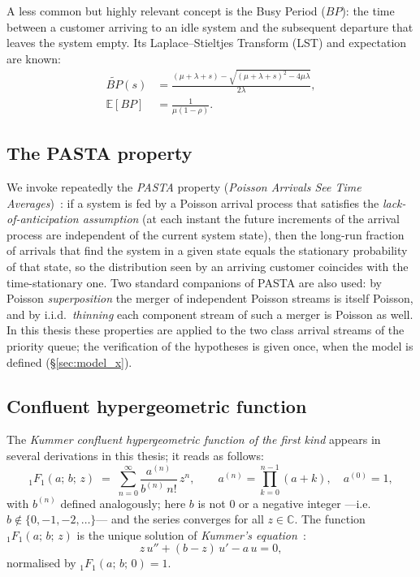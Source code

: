 A less common but highly relevant concept is the Busy Period ($BP$): the time between a customer arriving to an idle system and the subsequent departure that leaves the system empty. Its Laplace--Stieltjes Transform (LST) and expectation are known:
\begin{align}
    \widetilde{BP}(s) &= \frac{(\mu+\lambda+s) - \sqrt{(\mu+\lambda+s)^2 - 4\mu\lambda}}{2\lambda},\label{eq:mm1:bp_lst} \\
    \mathbb{E}[BP]    &= \frac{1}{\mu(1-\rho)}. \label{eq:mm1:bp_mean}
\end{align}

\subsection{The PASTA property}\label{ssec:priority}

We invoke repeatedly the \emph{PASTA} property (\emph{Poisson Arrivals See Time
Averages})~\cite{adan2002queueing}: if a system is fed by a Poisson arrival process that
satisfies the \emph{lack-of-anticipation assumption} (at each instant the future increments
of the arrival process are independent of the current system state), then the long-run
fraction of arrivals that find the system in a given state equals the stationary probability
of that state, so the distribution seen by an arriving customer coincides with the
time-stationary one. Two standard companions of PASTA are also used: by Poisson
\emph{superposition} the merger of independent Poisson streams is itself Poisson, and by
i.i.d.\ \emph{thinning} each component stream of such a merger is Poisson as well. In this
thesis these properties are applied to the two class arrival streams of the priority queue;
the verification of the hypotheses is given once, when the model is defined
(\S\ref{sec:model_x}).

\subsection{Confluent hypergeometric function}\label{ssec:kummer}

The \emph{Kummer confluent hypergeometric function of the first kind} appears in several derivations in this thesis; it reads as follows:
\begin{equation}
    {}_1F_1(a;\,b;\,z) \;=\;
        \sum_{n=0}^{\infty} \frac{a^{(n)}}{b^{(n)}\,n!}\,z^n,
    \qquad a^{(n)} = \prod_{k=0}^{n-1}(a+k),\quad a^{(0)}=1,
    \label{eq:kummer:series}
\end{equation}
with $b^{(n)}$ defined analogously; here $b$ is not $0$ or a negative integer ---i.e.\ $b \notin \{0,-1,-2,\dots\}$--- and the series converges for all
$z\in\mathbb{C}$.
The function ${}_1F_1(a;\,b;\,z)$ is the unique solution of \emph{Kummer's equation}~\cite{dlmf}:
\begin{equation*}
    z\,u'' + (b - z)\,u' - a\,u = 0,
\end{equation*}
normalised by ${}_1F_1(a;\,b;\,0) = 1$.


